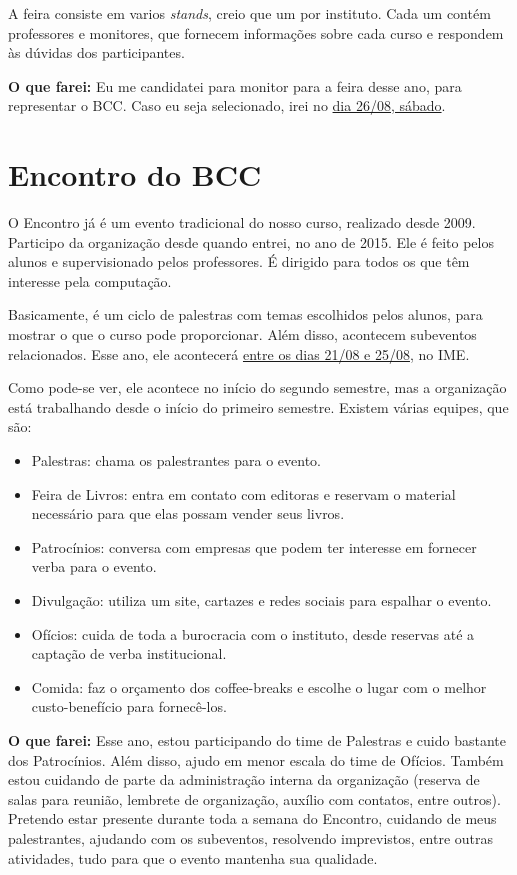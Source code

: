 \documentclass[12pt,letterpaper]{article}
\begin{document}
	A feira consiste em varios \textit{stands}, creio que um por instituto. Cada um contém professores e monitores, que fornecem informações sobre cada curso e respondem às dúvidas dos participantes.
	
	\textbf{O que farei:} Eu me candidatei para monitor para a feira desse ano, para representar o BCC. Caso eu seja selecionado, irei no \underline{dia 26/08, sábado}.
	
	\section{Encontro do BCC}
	
	O Encontro já é um evento tradicional do nosso curso, realizado desde 2009. Participo da organização desde quando entrei, no ano de 2015.	Ele é feito pelos alunos e supervisionado pelos professores. É dirigido para todos os que têm interesse pela computação.
	
	Basicamente, é um ciclo de palestras com temas escolhidos pelos alunos, para mostrar o que o curso pode proporcionar. Além disso, acontecem subeventos relacionados. Esse ano, ele acontecerá \underline{entre os dias 21/08 e 25/08}, no IME. 
	
	Como pode-se ver, ele acontece no início do segundo semestre, mas a organização está trabalhando desde o início do primeiro semestre. Existem várias equipes, que são:
	
	\begin{itemize}
		\item Palestras: chama os palestrantes para o evento.
		\item Feira de Livros: entra em contato com editoras e reservam o material necessário para que elas possam vender seus livros.
		\item Patrocínios: conversa com empresas que podem ter interesse em fornecer verba para o evento.
		\item Divulgação: utiliza um site, cartazes e redes sociais para espalhar o evento.
		\item Ofícios: cuida de toda a burocracia com o instituto, desde reservas até a captação de verba institucional.
		\item Comida: faz o orçamento dos coffee-breaks e escolhe o lugar com o melhor custo-benefício para fornecê-los.
	\end{itemize}
	
	\textbf{O que farei:} Esse ano, estou participando do time de Palestras e cuido bastante dos Patrocínios. Além disso, ajudo em menor escala do time de Ofícios. Também estou cuidando de parte da administração interna da organização (reserva de salas para reunião, lembrete de organização, auxílio com contatos, entre outros). Pretendo estar presente durante toda a semana do Encontro, cuidando de meus palestrantes, ajudando com os subeventos, resolvendo imprevistos, entre outras atividades, tudo para que o evento mantenha sua qualidade.
	
\end{document}
